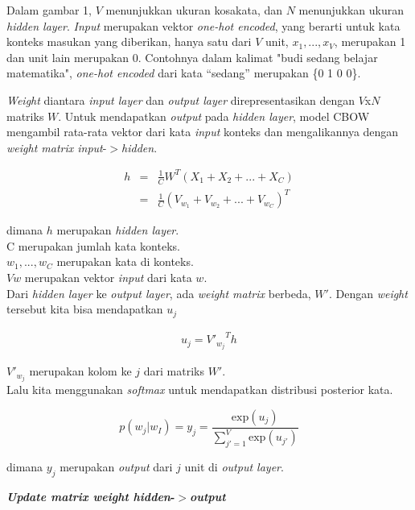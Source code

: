 \documentclass[12pt]{report}
\begin{document}
\begin{enumerate}
Dalam gambar 1, $V$ menunjukkan ukuran kosakata, dan $N$ menunjukkan ukuran \textit{hidden layer}. \textit{Input} merupakan vektor \textit{one-hot encoded}, yang berarti untuk kata konteks masukan yang diberikan, hanya satu dari $V$ unit, ${x_1, ..., x_V }$, merupakan 1 dan unit lain merupakan 0. Contohnya dalam kalimat "budi sedang belajar matematika", \textit{one-hot encoded} dari kata “sedang” merupakan \{0 1 0 0\}.

\textit{Weight} diantara \textit{input layer} dan \textit{output layer} direpresentasikan dengan $V$x$N$ matriks $W$. Untuk mendapatkan \textit{output} pada \textit{hidden layer}, model CBOW mengambil rata-rata vektor dari kata \textit{input} konteks dan mengalikannya dengan \textit{weight matrix input}-$>$\textit{hidden}.

\begin{eqnarray}
h & = & \frac{1}{C}W^T ( X_1 + X_2 + ... + X_C)\\
& = & \frac{1}{C} ( V_{w_1} +V_{w_2}+ ... + V_{w_C})^T \label{eq2}
\end{eqnarray}

dimana $h$ merupakan \textit{hidden layer}.\\ C merupakan jumlah kata konteks.\\ $w_1, ..., w_C$ merupakan kata di konteks. \\$Vw$ merupakan vektor \textit{input} dari kata $w$. \\
Dari \textit{hidden layer} ke \textit{output layer}, ada \textit{weight matrix} berbeda, $W'$. Dengan \textit{weight} tersebut kita bisa mendapatkan $u_j$

\begin{eqnarray}
u_j = {V'_{w_j}}^Th \label{eq3}
\end{eqnarray}

$V'_{w_j}$ merupakan kolom ke $j$ dari matriks $W'$. \\Lalu kita menggunakan \textit{softmax} untuk mendapatkan distribusi posterior kata.

\begin{equation}
p(w_j|w_I) = y_j = \frac {\text{exp}(u_j)}{\sum_{j'=1}^{V}\text{exp}(u_{j'})} \label{eq4}
\end{equation}

dimana $y_j$ merupakan \textit{output} dari $j$ unit di \textit{output layer}.
\newline
\newline

\textbf{\textit{Update matrix weight hidden}-$>$\textit{output}}


\end{enumerate}
\end{document}
